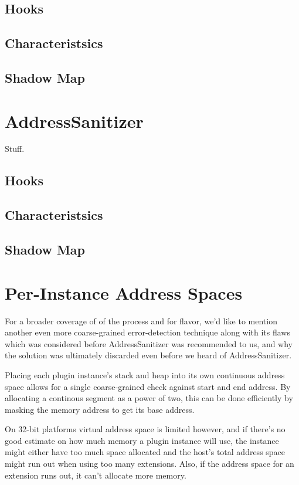 \subsection {Hooks}

\subsection {Characteristsics}

\subsection {Shadow Map}


\section {AddressSanitizer}

Stuff.

\subsection {Hooks}

\subsection {Characteristsics}

\subsection {Shadow Map}


\section {Per-Instance Address Spaces}

For a broader coverage of of the process and for flavor, we'd like to mention
another even more coarse-grained error-detection technique along with its flaws
which was considered before AddressSanitizer was recommended to us, and why the
solution was ultimately discarded even before we heard of AddressSanitizer.

Placing each plugin instance's stack and heap into its own continuous address
space allows for a single coarse-grained check against start and end address. By
allocating a continous segment as a power of two, this can be done efficiently
by masking the memory address to get its base address.

On 32-bit platforms virtual address space is limited however, and if there's no
good estimate on how much memory a plugin instance will use, the instance might
either have too much space allocated and the host's total address space
might run out when using too many extensions. Also, if the address space for an
extension runs out, it can't allocate more memory.

